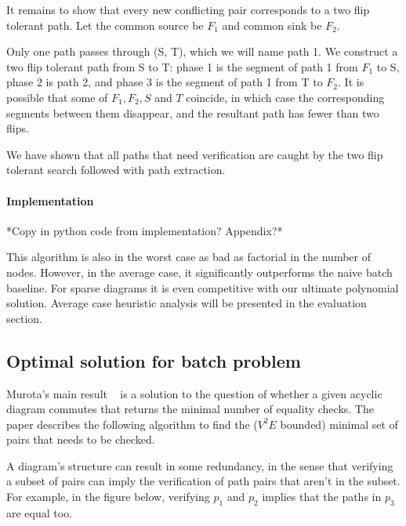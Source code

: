 \documentclass[sigplan,review,anonymous]{acmart}
\begin{document}
It remains to show that every new conflicting pair corresponds to a two flip tolerant path. Let the common source be $F_1$ and common sink be $F_2$. 

Only one path passes through (S, T), which we will name path 1. We construct a two flip tolerant path from S to T: phase 1 is the segment of path 1 from $F_1$ to S, phase 2 is path 2, and phase 3 is the segment of path 1 from T to $F_2$. It is possible that some of $F_1, F_2, S$ and $T$ coincide, in which case the corresponding segments between them disappear, and the resultant path has fewer than two flips.

We have shown that all paths that need verification are caught by the two flip tolerant search followed with path extraction.

\paragraph{Implementation}
*Copy in python code from implementation? Appendix?*

This algorithm is also in the worst case as bad as factorial in the number of nodes. However, in the average case, it significantly outperforms the naive batch baseline. For sparse diagrams it is even competitive with our ultimate polynomial solution. Average case heuristic analysis will be presented in the evaluation section.

\subsection{Optimal solution for batch problem}
Murota's main result ~\cite{commutative} is a solution to the question of whether a given acyclic diagram commutes that returns the minimal number of equality checks. The paper describes the following algorithm to find the ($V^2E$ bounded) minimal set of pairs that needs to be checked.

A diagram's structure can result in some redundancy, in the sense that verifying a subset of pairs can imply the verification of path pairs that aren't in the subset.
For example, in the figure below, verifying $p_1$ and $p_2$ implies that the paths in $p_3$ are equal too.
\end{document}

